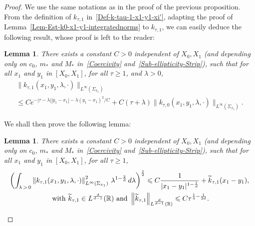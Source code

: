 \documentclass[10pt]{amsart}
\newtheorem{lemm}[theo]{Lemma}\newtheorem{prop}[theo]{Proposition}\newtheorem{coro}[theo]{Corollary}\newtheorem{conj}[theo]{Conjecture}
\theoremstyle{definition}\newtheorem{defi}[theo]{Definition}\newtheorem{rema}[theo]{Remark}\newtheorem{exam}[theo]{Example}\newtheorem{exem}[theo]{Example}\newtheorem{nota}[theo]{Notation}
\newcommand*\R{\mathbb{R}}
\newcommand{\norm}[1]{\left\Vert#1\right\Vert}
\renewcommand{\leq}{\leqslant}
\renewcommand{\geq}{\geqslant}
\renewcommand{\tilde}{\widetilde}
\let\oldtilde\tilde
\renewcommand*{\tilde}[1]{\mathchoice{\widetilde{#1}}{\widetilde{#1}}{\oldtilde{#1}}{\oldtilde{#1}}}
\begin{document}
\begin{proof}
We use the same notations as in the proof of the previous proposition. From the definition of $k_{\tau,1}$ in~\eqref{Def-k-tau-1-x1-y1-xi'}, adapting the proof of Lemma~\ref{Lem-Est-k0-x1-y1-integratednorms} to $k_{\tau,1}$, we can easily deduce the following result, whose proof is left to the reader:

\begin{lemm}\label{Lem-Est-k-1-x1-y1}
There exists a constant $C >0$ independent of $X_0, X_1$ (and depending only on $c_0$, $m_*$ and $M_*$ in~\eqref{Coercivity} and~\eqref{Sub-ellipticity-Strip}), such that for all $x_1$ and $y_1$ in $[X_0, X_1]$, for all $\tau \geq 1$, and $\lambda >0$,
\begin{multline}\label{Est-k-tau-1-x1-y1}
\| k_{\tau, 1}(x_1,y_1,\lambda, \cdot) \|_{L^\infty\left(\Sigma_{x_1}\right)}\\ 
\leq C e^{-|\tau - \lambda| | y_1 - x_1 | - \lambda (y_1 - x_1)^2/C }
+ C (\tau + \lambda) \| k_{\tau, 0}(x_1,y_1,\lambda, \cdot) \|_{L^\infty\left(\Sigma_{x_1}\right)}.
\end{multline}
\end{lemm}

We shall then prove the following lemma:
\begin{lemm}\label{Lem-Est-k1-x1-y1-integratednorms}
There exists a constant $C >0$ independent of $X_0, X_1$ (and depending only on $c_0$, $m_*$ and $M_*$ in~\eqref{Coercivity} and~\eqref{Sub-ellipticity-Strip}), such that for all $x_1$ and $y_1$ in $[X_0, X_1]$, for all $\tau \geq 1$,
\begin{multline}\label{est-k1-x1-y1-Lp-L2}
\left(\int_{\lambda\,>\,0} \norm{k_{\tau,1}(x_1, y_1,\lambda, \cdot) }^2_{L^\infty(\Sigma_{x_1})} \, \lambda^{1 -\frac{2}{d}}\, d\lambda\right)^{\frac{1}{2}}
\leq C\frac{1}{|x_1-y_1|^{1-\frac{1}{d}}} + \tilde k_{\tau,1}(x_1-y_1),
\\
 \text{ with }\tilde k_{\tau,1} \in L^{\frac{d}{d-1}} (\R)\text{ and }
\left\|\tilde k_{\tau,1}\right\|_{L^{\frac{d}{d-1}} (\R)} \leq C \tau^{\frac{1}{4}-\frac{1}{2d}}.
\end{multline}
\end{lemm}


\end{proof}
\end{document}
